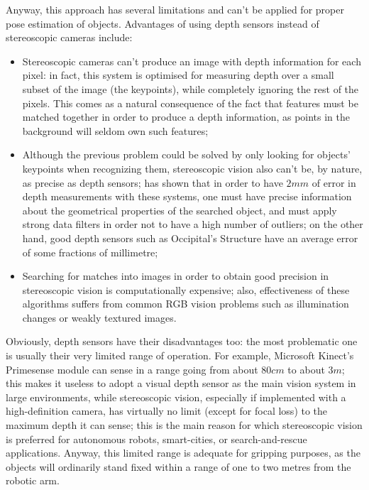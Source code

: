 Anyway, this approach has several limitations and can't be applied for proper
pose estimation of objects. Advantages of using depth sensors instead of
stereoscopic cameras include:
\begin{itemize}
  \item{Stereoscopic cameras can't produce an image with depth information for
      each pixel: in fact, this system is optimised for measuring depth over a
      small subset of the image (the keypoints), while completely ignoring the
      rest of the pixels. This comes as a natural consequence of the fact that
      features must be matched together in order to produce a depth information,
    as points in the background will seldom own such features;}
  \item{Although the previous problem could be solved by only looking for
      objects' keypoints when recognizing them, stereoscopic vision also can't
      be, by nature, as precise as depth sensors; \cite{stereo-precision} has
      shown that in order to have $2\unit{mm}$ of error in depth measurements
      with these systems, one must have precise information about the
      geometrical properties of the searched object, and must apply strong data
      filters in order not to have a high number of outliers; on the other hand,
      good depth sensors such as Occipital's Structure have an average error of
    some fractions of millimetre;}
  \item{Searching for matches into images in order to obtain good precision in
      stereoscopic vision is computationally expensive; also, effectiveness of
      these algorithms suffers from common RGB vision problems such as
    illumination changes or weakly textured images.}
\end{itemize}

Obviously, depth sensors have their disadvantages too: the most problematic one
is usually their very limited range of operation. For example, Microsoft
Kinect's Primesense module can sense in a range going from about $80\unit{cm}$
to about $3\unit{m}$; this makes it useless to adopt a visual depth sensor as
the main vision system in large environments, while stereoscopic vision,
especially if implemented with a high-definition camera, has
virtually no limit (except for focal loss) to the maximum depth it can sense;
this is the main reason for which stereoscopic vision is preferred for
autonomous robots, smart-cities, or search-and-rescue applications. Anyway, this
limited range is adequate for gripping purposes, as the objects will ordinarily
stand fixed within a range of one to two metres from the robotic arm.

